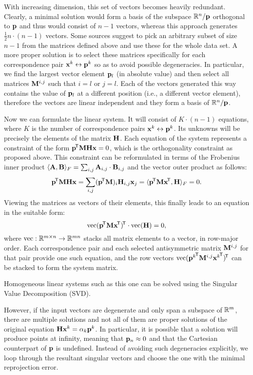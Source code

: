 With increasing dimension, this set of vectors becomes heavily redundant.
Clearly, a minimal solution would form a basis of the subspace $\mathbb{R}^n / \mathbf{p}$ orthogonal to $\mathbf{p}$ and thus would consist of $n - 1$ vectors, whereas this approach generates $\frac {1} {2} n \cdot (n - 1)$ vectors.
Some sources\cite{MVG} suggest to pick an arbitrary subset of size $n - 1$ from the matrices defined above and use these for the whole data set.
A more proper solution is to select these matrices specifically for each correspondence pair $\mathbf{x}^k \leftrightarrow \mathbf{p}^k$ so as to avoid possible degeneracies.
In particular, we find the largest vector element $\mathbf{p}_l$ (in absolute value) and then select all matrices $\mathbf{M}^{i, j}$ such that $i = l$ or $j = l$.
Each of the vectors generated this way contains the value of $\mathbf{p}_l$ at a different position (i.e., a different vector element), therefore the vectors are linear independent and they form a basis of $\mathbb{R}^n / \mathbf{p}$.

Now we can formulate the linear system.
It will consist of $K \cdot (n - 1)$ equations, where $K$ is the number of correspondence pairs $\mathbf{x}^k \leftrightarrow \mathbf{p}^k$.
Its unknowns will be precisely the elements of the matrix $\mathbf{H}$.
Each equation of the system represents a constraint of the form $\mathbf{p}^{\!\mathsf{T}} \mathbf{M} \mathbf{H} \mathbf{x} = 0$, which is the orthogonality constraint as proposed above.
This constraint can be reformulated in terms of the Frobenius inner product $\langle \mathbf{A}, \mathbf{B} \rangle_F = \sum_{i, j} \mathbf{A}_{i, j} \cdot \mathbf{B}_{i, j}$ and the vector outer product as follows:
$$\mathbf{p}^{\!\mathsf{T}} \mathbf{M} \mathbf{H} \mathbf{x} = \sum_{i, j} (\mathbf{p}^{\!\mathsf{T}} \mathbf{M})_i \mathbf{H}_{i, j} \mathbf{x}_j = \langle \mathbf{p}^{\!\mathsf{T}} \mathbf{M} \mathbf{x}^{\!\mathsf{T}}, \mathbf{H} \rangle_F = 0.$$
Viewing the matrices as vectors of their elements, this finally leads to an equation in the suitable form:
$$\textrm{vec} (\mathbf{p}^{\!\mathsf{T}} \mathbf{M} \mathbf{x}^{\!\mathsf{T}})^{\!\mathsf{T}} \cdot \textrm{vec}(\mathbf{H}) = 0,$$
where $\textrm{vec} : \mathbb{R}^{m \times n} \to \mathbb{R}^{mn}$ stacks all matrix elements to a vector, in row-major order.
Each correspondence pair and each selected antisymmetric matrix $\mathbf{M}^{i, j}$ for that pair provide one such equation, and the row vectors $\textrm{vec} ({\mathbf{p}^k}^{\!\mathsf{T}} \mathbf{M}^{i, j} {\mathbf{x}^k}^{\!\mathsf{T}})^{\!\mathsf{T}}$ can be stacked to form the system matrix.

Homogeneous linear systems such as this one can be solved using the Singular Value Decomposition (SVD).

\todo{\dots}
However, if the input vectors are degenerate and only span a subspace of $\mathbb{R}^m$, there are multiple solutions and not all of them are proper solutions of the original equation $\mathbf{H} \mathbf{x}^k = \alpha_k \mathbf{p}^k$.
In particular, it is possible that a solution will produce points at infinity, meaning that $\mathbf{p}_n \approx 0$ and that the Cartesian counterpart of $\mathbf{p}$ is undefined.
Instead of avoiding such degeneracies explicitly, we loop through the resultant singular vectors and choose the one with the minimal reprojection error.

